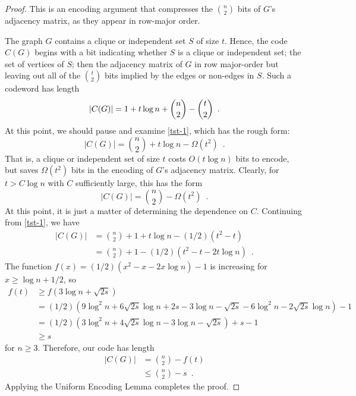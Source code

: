 \documentclass{patmorin}
\begin{document}
\begin{proof}
  This is an encoding argument that compresses the $\binom{n}{2}$ bits
  of $G$'s adjacency matrix, as they appear in row-major order.
  
  The graph $G$ contains a clique or independent set $S$ of size
  $t$. Hence, the code $C(G)$ begins with a bit indicating whether $S$
  is a clique or independent set; the set of vertices of $S$; then the
  adjacency matrix of $G$ in row major-order but leaving out all of
  the $\binom{t}{2}$ bits implied by the edges or non-edges in
  $S$. Such a codeword has length
  \begin{equation} 
    |C(G)|  = 1 + t\log n + \binom{n}{2}-\binom{t}{2} \enspace .  \eqlabel{tst-1}
  \end{equation}
  At this point, we should pause and examine \eqref{tst-1}, which has
  the rough form:
  \[ |C(G)|  = \binom{n}{2} + t\log n - \Omega(t^2) \enspace . \]
  That is, a clique or independent set of size $t$ costs $O(t\log n)$ bits
  to encode, but saves $\Omega(t^2)$ bits in the encoding of $G$'s adjacency matrix.
  Clearly, for $t>C\log n$ with $C$ sufficiently large, this has the form 
  \[ |C(G)|  = \binom{n}{2} - \Omega(t^2) \enspace . \]
  At this point, it is just a matter of determining the dependence on $C$.
  Continuing from \eqref{tst-1}, we have
  \begin{align*}
    |C(G)| 
    & = \binom{n}{2} + 1 + t\log n - (1/2)(t^2 - t) \\
    & = \binom{n}{2} + 1 - (1/2)(t^2 - t - 2t \log n) \enspace .
  \end{align*}
  The function $f(x) = (1/2)(x^2 - x - 2x \log n) - 1$ is increasing
  for $x \geq \log n + 1/2$, so
  \begin{align*}
    f(t) &\ge f(3\log n + \sqrt{2s}) \\
    &= (1/2)(9 \log^2 n + 6 \sqrt{2s} \log n + 2s - 3 \log n - \sqrt{2s} - 6 \log^2 n - 2 \sqrt{2s} \log n) - 1 \\
    &= (1/2)(3 \log^2 n + 4 \sqrt{2s} \log n - 3 \log n - \sqrt{2s}) + s - 1 \\
    &\ge s
  \end{align*}
  for $n \ge 3$. Therefore, our code has length
  \begin{align*}
    |C(G)| & = \binom{n}{2} - f(t) \\
    & \le \binom{n}{2} - s \enspace .
  \end{align*}
  Applying the Uniform Encoding Lemma completes the proof.
\end{proof}
\end{document}
